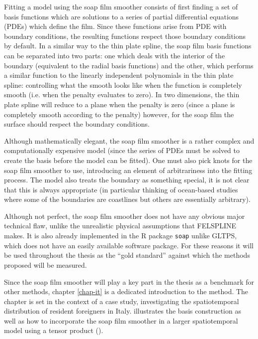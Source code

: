 Fitting a model using the soap film smoother consists of first finding a set of basis functions which are solutions to a series of partial differential equations (PDEs) which define the film. Since these functions arise from PDE with boundary conditions, the resulting functions respect those boundary conditions by default. In a similar way to the thin plate spline, the soap film basis functions can be separated into two parts:  one which deals with the interior of the boundary (equivalent to the radial basis functions) and the other, which performs a similar function to the linearly independent polynomials in the thin plate spline: controlling what the smooth looks like when the function is completely smooth (i.e. when the penalty evaluates to zero). In two dimensions, the thin plate spline will reduce to a plane when the penalty is zero (since a plane is completely smooth according to the penalty) however, for the soap film the surface should respect the boundary conditions.

Although mathematically elegant, the soap film smoother is a rather complex and computationally expensive model (since the series of PDEs must be solved to create the basis before the model can be fitted). One must also pick knots for the soap film smoother to use, introducing an element of arbitrariness into the fitting process. The model also treats the boundary as something special, it is not clear that this is always appropriate (in particular thinking of ocean-based studies where some of the boundaries are coastlines but others are essentially arbitrary).

Although not perfect, the soap film smoother does not have any obvious major technical flaw, unlike the unrealistic physical assumptions that FELSPLINE makes. It is also already implemented in the \textsf{R} package \texttt{soap} unlike GLTPS, which does not have an easily available software package. For these reasons it will be used throughout the thesis as the ``gold standard'' against which the methods proposed will be measured. 

Since the soap film smoother will play a key part in the thesis as a benchmark for other methods, chapter \ref{chap-it} is a dedicated introduction to the method. The chapter is set in the context of a case study, investigating the spatiotemporal distribution of resident foreigners in Italy.  illustrates the basis construction as well as how to incorporate the soap film smoother in a larger spatiotemporal model using a tensor product (). 


